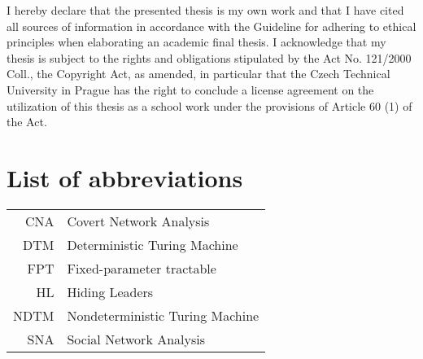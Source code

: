 \documentclass[english,bachelor,unicode]{ctufit-thesis}
\theoremstyle{plain}
\theoremstyle{definition}
\theoremstyle{remark}
\numberwithin{theorem}{chapter}
\begin{document}
\begin{declarationpage}
    I hereby declare that the presented thesis is my own work and that I have cited all sources of information in accordance with the Guideline
    for adhering to ethical principles when elaborating an academic final thesis.
    I acknowledge that my thesis is subject to the rights and obligations stipulated by the Act No. 121/2000 Coll.,
    the Copyright Act, as amended, in particular that the Czech Technical University in Prague has the right to conclude
    a license agreement on the utilization of this thesis as a school work under the provisions of Article 60 (1) of the Act.
\end{declarationpage}


\printabstractpage %


\chapter{List of abbreviations}

\begin{tabular}{rl}
    CNA  & Covert Network Analysis\\
    DTM  & Deterministic Turing Machine\\
    FPT  & Fixed-parameter tractable\\
    HL   & Hiding Leaders\\
    NDTM & Nondeterministic Turing Machine\\
    SNA  & Social Network Analysis
\end{tabular}


\mainmatter\mainmatterinit %







%
%

\appendix\appendixinit %


\backmatter %

\printbibliography %

\end{document}
